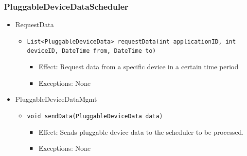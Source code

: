     \subsubsection{PluggableDeviceDataScheduler}
        \begin{itemize}
            \item RequestData
            \begin{itemize}
                \item \texttt{List<PluggableDeviceData> requestData(int applicationID, int deviceID, DateTime from, DateTime to)}
                \begin{itemize}
                    \item Effect: Request data from a specific device in a certain time period
                    \item Exceptions: None
                \end{itemize}
            \end{itemize}

            \item PluggableDeviceDataMgmt
            \begin{itemize}
                \item \texttt{void sendData(PluggableDeviceData data)}
                \begin{itemize}
                    \item Effect: Sends pluggable device data to the scheduler to be processed.
                    \item Exceptions: None
                \end{itemize}
            \end{itemize}
        \end{itemize}

